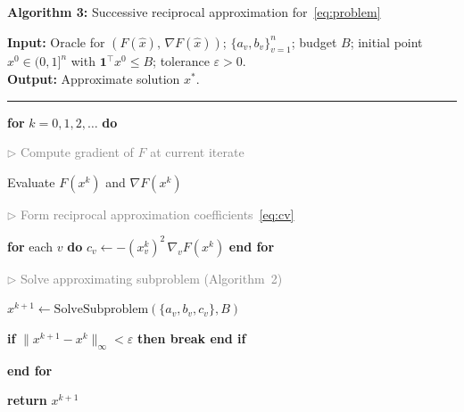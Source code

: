 \documentclass{article}
\newcommand{\kw}[1]{\textbf{#1}}
\newcommand{\cmt}[1]{\textcolor{gray}{\(\triangleright\) #1}}
\begin{document}
\bigskip

\begin{mdframed}[linewidth=0.8pt, innertopmargin=8pt, innerbottommargin=8pt,
                 innerrightmargin=10pt, innerleftmargin=10pt]
\textbf{Algorithm 3:} Successive reciprocal approximation for~\eqref{eq:problem}

\medskip
\textbf{Input:} Oracle for $(F(\hat x),\,\nabla F(\hat x))$;\;
$\{a_v, b_v\}_{v=1}^n$;\; budget $B$;\;
initial point $x^0 \in (0,1]^n$ with $\mathbf{1}^\top x^0 \leq B$;\;
tolerance $\varepsilon > 0$.\\
\textbf{Output:} Approximate solution $x^*$.

\medskip\hrule\medskip

\begin{algolist}
  \item \kw{for} $k = 0, 1, 2, \ldots$ \kw{do}
  \begin{algoinner}
    \item \cmt{Compute gradient of $F$ at current iterate}
    \item Evaluate $F(x^k)$ and $\nabla F(x^k)$
    \medskip
    \item \cmt{Form reciprocal approximation coefficients~\eqref{eq:cv}}
    \item \kw{for} each $v$ \kw{do}\;
      $c_v \leftarrow -(x_v^k)^2\,\nabla_v F(x^k)$\;
      \kw{end for}
    \medskip
    \item \cmt{Solve approximating subproblem (Algorithm~2)}
    \item $x^{k+1} \leftarrow \text{SolveSubproblem}(\{a_v, b_v, c_v\}, B)$
    \medskip
    \item \kw{if} $\|x^{k+1} - x^k\|_\infty < \varepsilon$\;
          \kw{then break end if}
  \end{algoinner}
  \item \kw{end for}
  \item \textbf{return} $x^{k+1}$
\end{algolist}
\end{mdframed}
\end{document}
